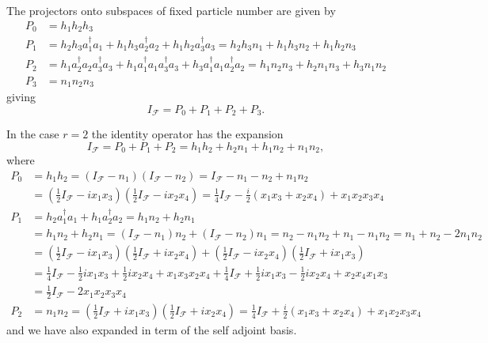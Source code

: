 \documentclass[aps,preprint]{revtex4}%
\begin{document}
The projectors onto subspaces of fixed particle number are given by
\begin{align}
P_{0} &  =h_{1}h_{2}h_{3}\\
P_{1} &  =h_{2}h_{3}a_{1}^{\dagger}a_{1}+h_{1}h_{3}a_{2}^{\dagger}a_{2}%
+h_{1}h_{2}a_{3}^{\dagger}a_{3}=h_{2}h_{3}n_{1}+h_{1}h_{3}n_{2}+h_{1}%
h_{2}n_{3}\\
P_{2} &  =h_{1}a_{2}^{\dagger}a_{2}a_{3}^{\dagger}a_{3}+h_{1}a_{1}^{\dagger
}a_{1}a_{3}^{\dagger}a_{3}+h_{3}a_{1}^{\dagger}a_{1}a_{2}^{\dagger}a_{2}%
=h_{1}n_{2}n_{3}+h_{2}n_{1}n_{3}+h_{3}n_{1}n_{2}\\
P_{3} &  =n_{1}n_{2}n_{3}%
\end{align}
giving
\begin{equation}
I_{\mathcal{F}}=P_{0}+P_{1}+P_{2}+P_{3}.
\end{equation}


In the case $r=2$ the identity operator has the expansion
\begin{equation}
I_{\mathcal{F}}=P_{0}+P_{1}+P_{2}=h_{1}h_{2}+h_{2}n_{1}+h_{1}n_{2}+n_{1}n_{2},
\end{equation}
where%
\begin{align}
P_{0} &  =h_{1}h_{2}=\left(  I_{\mathcal{F}}-n_{1}\right)  \left(
I_{\mathcal{F}}-n_{2}\right)  =I_{\mathcal{F}}-n_{1}-n_{2}+n_{1}n_{2}\\
&  =\left(  \frac{1}{2}I_{\mathcal{F}}-ix_{1}x_{3}\right)  \left(  \frac{1}%
{2}I_{\mathcal{F}}-ix_{2}x_{4}\right)  =\frac{1}{4}I_{\mathcal{F}}-\frac{i}%
{2}\left(  x_{1}x_{3}+x_{2}x_{4}\right)  +x_{1}x_{2}x_{3}x_{4}\\
P_{1} &  =h_{2}a_{1}^{\dagger}a_{1}+h_{1}a_{2}^{\dagger}a_{2}=h_{1}n_{2}%
+h_{2}n_{1}\\
&  =h_{1}n_{2}+h_{2}n_{1}=\left(  I_{\mathcal{F}}-n_{1}\right)  n_{2}+\left(
I_{\mathcal{F}}-n_{2}\right)  n_{1}=n_{2}-n_{1}n_{2}+n_{1}-n_{1}n_{2}%
=n_{1}+n_{2}-2n_{1}n_{2}\\
&  =\left(  \frac{1}{2}I_{\mathcal{F}}-ix_{1}x_{3}\right)  \left(  \frac{1}%
{2}I_{\mathcal{F}}+ix_{2}x_{4}\right)  +\left(  \frac{1}{2}I_{\mathcal{F}%
}-ix_{2}x_{4}\right)  \left(  \frac{1}{2}I_{\mathcal{F}}+ix_{1}x_{3}\right)
\\
&  =\frac{1}{4}I_{\mathcal{F}}-\frac{1}{2}ix_{1}x_{3}+\frac{1}{2}ix_{2}%
x_{4}+x_{1}x_{3}x_{2}x_{4}+\frac{1}{4}I_{\mathcal{F}}+\frac{1}{2}ix_{1}%
x_{3}-\frac{1}{2}ix_{2}x_{4}+x_{2}x_{4}x_{1}x_{3}\\
&  =\frac{1}{2}I_{\mathcal{F}}-2x_{1}x_{2}x_{3}x_{4}\\
P_{2} &  =n_{1}n_{2}=\left(  \frac{1}{2}I_{\mathcal{F}}+ix_{1}x_{3}\right)
\left(  \frac{1}{2}I_{\mathcal{F}}+ix_{2}x_{4}\right)  =\frac{1}%
{4}I_{\mathcal{F}}+\frac{i}{2}\left(  x_{1}x_{3}+x_{2}x_{4}\right)
+x_{1}x_{2}x_{3}x_{4}%
\end{align}
and we have also expanded in term of the self adjoint basis. 
\end{document}
